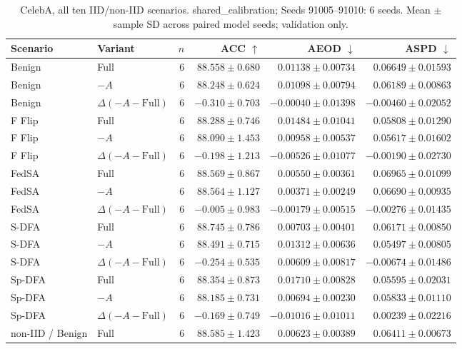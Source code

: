 \begin{table}[t]
\centering
\small
\caption{CelebA, all ten IID/non-IID scenarios. shared\_calibration; Seeds 91005–91010: 6 seeds. Mean $\pm$ sample SD across paired model seeds; validation only.}
\begin{tabular}{llrrrr}
\toprule
Scenario & Variant & $n$ & ACC $\uparrow$ & AEOD $\downarrow$ & ASPD $\downarrow$ \\
\midrule
Benign & Full & 6 & $88.558 \pm 0.680$ & $0.01138 \pm 0.00734$ & $0.06649 \pm 0.01593$ \\
Benign & $-A$ & 6 & $88.248 \pm 0.624$ & $0.01098 \pm 0.00794$ & $0.06189 \pm 0.00863$ \\
Benign & $\Delta(-A-\mathrm{Full})$ & 6 & $-0.310 \pm 0.703$ & $-0.00040 \pm 0.01398$ & $-0.00460 \pm 0.02052$ \\
F Flip & Full & 6 & $88.288 \pm 0.746$ & $0.01484 \pm 0.01041$ & $0.05808 \pm 0.01290$ \\
F Flip & $-A$ & 6 & $88.090 \pm 1.453$ & $0.00958 \pm 0.00537$ & $0.05617 \pm 0.01602$ \\
F Flip & $\Delta(-A-\mathrm{Full})$ & 6 & $-0.198 \pm 1.213$ & $-0.00526 \pm 0.01077$ & $-0.00190 \pm 0.02730$ \\
FedSA & Full & 6 & $88.569 \pm 0.867$ & $0.00550 \pm 0.00361$ & $0.06965 \pm 0.01099$ \\
FedSA & $-A$ & 6 & $88.564 \pm 1.127$ & $0.00371 \pm 0.00249$ & $0.06690 \pm 0.00935$ \\
FedSA & $\Delta(-A-\mathrm{Full})$ & 6 & $-0.005 \pm 0.983$ & $-0.00179 \pm 0.00515$ & $-0.00276 \pm 0.01435$ \\
S-DFA & Full & 6 & $88.745 \pm 0.786$ & $0.00703 \pm 0.00401$ & $0.06171 \pm 0.00850$ \\
S-DFA & $-A$ & 6 & $88.491 \pm 0.715$ & $0.01312 \pm 0.00636$ & $0.05497 \pm 0.00805$ \\
S-DFA & $\Delta(-A-\mathrm{Full})$ & 6 & $-0.254 \pm 0.535$ & $0.00609 \pm 0.00817$ & $-0.00674 \pm 0.01486$ \\
Sp-DFA & Full & 6 & $88.354 \pm 0.873$ & $0.01710 \pm 0.00828$ & $0.05595 \pm 0.02031$ \\
Sp-DFA & $-A$ & 6 & $88.185 \pm 0.731$ & $0.00694 \pm 0.00230$ & $0.05833 \pm 0.01110$ \\
Sp-DFA & $\Delta(-A-\mathrm{Full})$ & 6 & $-0.169 \pm 0.749$ & $-0.01016 \pm 0.01011$ & $0.00239 \pm 0.02216$ \\
non-IID / Benign & Full & 6 & $88.585 \pm 1.423$ & $0.00623 \pm 0.00389$ & $0.06411 \pm 0.00673$ \\

\end{tabular}
\end{table}
